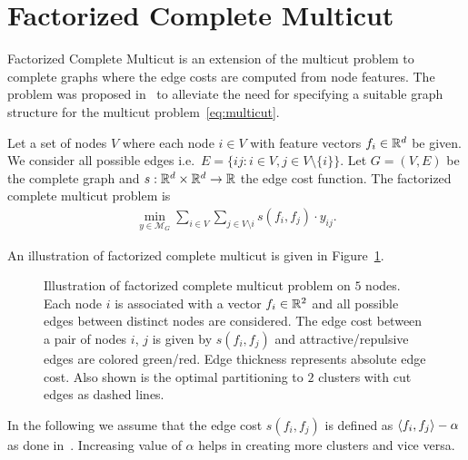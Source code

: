 \section{Factorized Complete Multicut}
\label{sec:complete_multicut}
Factorized Complete Multicut is an extension of the multicut problem to complete graphs where the edge costs are computed from node features.
The problem was proposed in~\cite{aabbas23_clusterfug} to alleviate the need for specifying a suitable graph structure for the multicut problem~\eqref{eq:multicut}. 
\begin{definition}
    Let a set of nodes $V$ where each node $i \in V$ with feature vectors $f_i \in \mathbb{R}^d$ be given.
    We consider all possible edges i.e.\ $E = \{ij : i \in V, j \in V\setminus \{i\} \}$. 
    Let $G = (V, E)$ be the complete graph and $s: \mathbb{R}^d \times \mathbb{R}^d \rightarrow \mathbb{R}$ the edge cost function.
    The factorized complete multicut problem is
    \begin{equation}
        \label{eq:factorized_complete_multicut}
        \begin{array}{rl}
            \min_{y \in \mathcal{M}_G} \sum\limits_{i \in V} \sum\limits_{j \in V \setminus i} s(f_i, f_j) \cdot y_{ij}.
        \end{array}
    \end{equation}
\end{definition}

An illustration of factorized complete multicut is given in Figure~\ref{fig:factorized-complete-multicut}.

\begin{figure}[H]
    \begin{center}
    \scalebox{1.5}{}
    \end{center}
    \caption{Illustration of factorized complete multicut problem on $5$ nodes. Each node $i$ is associated with a vector $f_i \in \mathbb{R}^2$ and all possible edges between distinct nodes are considered. The edge cost between a pair of nodes $i$, $j$ is given by $s(f_i, f_j)$ and attractive/repulsive edges are colored green/red. Edge thickness represents absolute edge cost. Also shown is the optimal partitioning to $2$ clusters with cut edges as dashed lines.}    
    \label{fig:factorized-complete-multicut}
\end{figure}
In the following we assume that the edge cost $s(f_i, f_j)$ is defined as $\langle f_i, f_j \rangle - \alpha$ as done in~\cite{aabbas23_clusterfug}. Increasing value of $\alpha$ helps in creating more clusters and vice versa.
